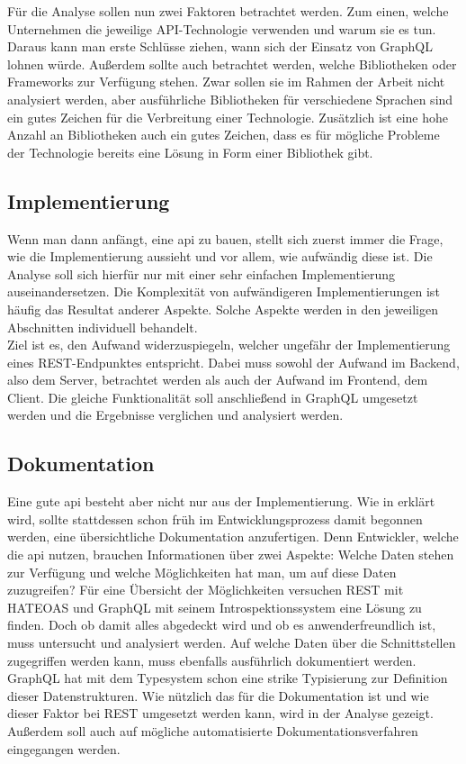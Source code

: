 Für die Analyse sollen nun zwei Faktoren betrachtet werden. Zum einen, welche Unternehmen die jeweilige API-Technologie verwenden und warum sie es tun. Daraus kann man erste Schlüsse ziehen, wann sich der Einsatz von GraphQL lohnen würde. Außerdem sollte auch betrachtet werden, welche Bibliotheken oder Frameworks zur Verfügung stehen. Zwar sollen sie im Rahmen der Arbeit nicht analysiert werden, aber ausführliche Bibliotheken für verschiedene Sprachen sind ein gutes Zeichen für die Verbreitung einer Technologie. Zusätzlich ist eine hohe Anzahl an Bibliotheken auch ein gutes Zeichen, dass es für mögliche Probleme der Technologie bereits eine Lösung in Form einer Bibliothek gibt.

\subsection{Implementierung}\label{implementierung}

Wenn man dann anfängt, eine \ac{api} zu bauen, stellt sich zuerst immer die Frage, wie die Implementierung aussieht und vor allem, wie aufwändig diese ist. Die Analyse soll sich hierfür nur mit einer sehr einfachen Implementierung auseinandersetzen. Die Komplexität von aufwändigeren Implementierungen ist häufig das Resultat anderer Aspekte. Solche Aspekte werden in den jeweiligen Abschnitten individuell behandelt.\\
Ziel ist es, den Aufwand widerzuspiegeln, welcher ungefähr der Implementierung eines REST-Endpunktes entspricht. Dabei muss sowohl der Aufwand im Backend, also dem Server, betrachtet werden als auch der Aufwand im Frontend, dem Client. Die gleiche Funktionalität soll anschließend in GraphQL umgesetzt werden und die Ergebnisse verglichen und analysiert werden.

\subsection{Dokumentation}\label{Dokumentation}

Eine gute \ac{api} besteht aber nicht nur aus der Implementierung. Wie in \parencite{APIYouWontHate2015} erklärt wird, sollte stattdessen schon früh im Entwicklungsprozess damit begonnen werden, eine übersichtliche Dokumentation anzufertigen. Denn Entwickler, welche die \ac{api} nutzen, brauchen Informationen über zwei Aspekte: Welche Daten stehen zur Verfügung und welche Möglichkeiten hat man, um auf diese Daten zuzugreifen? Für eine Übersicht der Möglichkeiten versuchen \ac{REST} mit \ac{HATEOAS} und GraphQL mit seinem Introspektionssystem eine Lösung zu finden. Doch ob damit alles abgedeckt wird und ob es anwenderfreundlich ist, muss untersucht und analysiert werden. Auf welche Daten über die Schnittstellen zugegriffen werden kann, muss ebenfalls ausführlich dokumentiert werden. GraphQL hat mit dem Typesystem schon eine strike Typisierung zur Definition dieser Datenstrukturen. Wie nützlich das für die Dokumentation ist und wie dieser Faktor bei \ac{REST} umgesetzt werden kann, wird in der Analyse gezeigt. Außerdem soll auch auf mögliche automatisierte Dokumentationsverfahren eingegangen werden.

